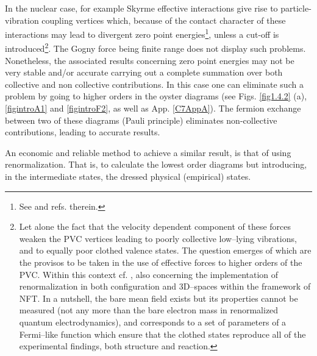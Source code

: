 \begin{subappendices}
 In the nuclear case, for example Skyrme effective interactions give 
 rise to particle-vibration coupling vertices which, because of the contact character of these interactions 
 may lead to divergent zero point energies\footnote{See \cite{Hellemans:13,Pastore:15} and refs. therein.}, unless a cut-off is introduced\footnote{Let alone the fact that the velocity dependent component of these forces weaken the PVC vertices leading to poorly collective low--lying vibrations, and to equally poor clothed valence states. The question emerges of which are the provisos to be taken in the use of effective forces to higher orders of the PVC. Within this context cf. \cite{Mahaux:85}, also \cite{Broglia:16,Barranco:17} concerning the implementation of renormalization in both configuration and 3D--spaces within the framework of NFT. In a nutshell, the bare mean field exists but its properties cannot be measured (not any more than the bare electron mass in renormalized quantum electrodynamics), and corresponds to a set of parameters of a Fermi--like function which ensure that the clothed states reproduce all of the experimental findings, both structure and reaction.}.
 The Gogny force being finite range does not display such problems. Nonetheless, 
 the associated results concerning zero point energies may not be very stable and/or accurate 
 carrying out a complete summation over both collective and non collective contributions. 
 In this case one can eliminate such a  problem by going to higher orders in the oyster diagrams (see Figs. \ref{fig1.4.2} (a), \ref{figintroA1} and \ref{figintroF2}, as well as App. \ref{C7AppA}). 
 The fermion exchange between two of these diagrams (Pauli principle)  eliminates  non-collective
 contributions, leading to accurate results.
 
 An economic and reliable method to achieve a similar result, 
 is that of using renormalization. That is, to calculate the lowest order diagrams 
 but introducing, in the intermediate states, the dressed physical (empirical) states.
 
 
 
 
 
 

\end{subappendices}






























\clearpage
\newpage













\renewcommand{\bibname}{Bibliography Ch 1}
 
% 
 